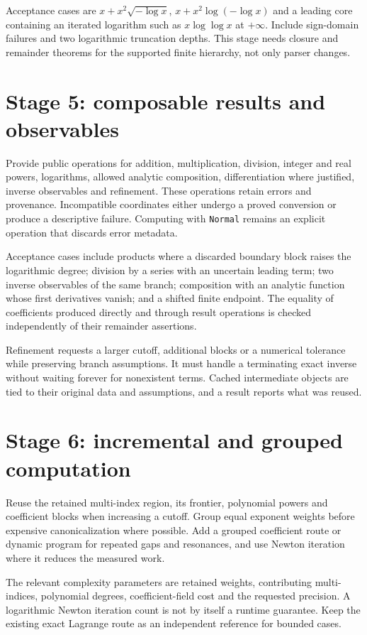 \documentclass[11pt,a4paper]{article}
\newcommand{\wl}[1]{\texttt{#1}}
\begin{document}
Acceptance cases are $x+x^2\sqrt{-\log x}$, $x+x^2\log(-\log x)$ and a leading core containing an iterated logarithm such as $x\log\log x$ at $+\infty$. Include sign-domain failures and two logarithmic truncation depths. This stage needs closure and remainder theorems for the supported finite hierarchy, not only parser changes.

\section{Stage 5: composable results and observables}

Provide public operations for addition, multiplication, division, integer and real powers, logarithms, allowed analytic composition, differentiation where justified, inverse observables and refinement. These operations retain errors and provenance. Incompatible coordinates either undergo a proved conversion or produce a descriptive failure. Computing with \wl{Normal} remains an explicit operation that discards error metadata.

Acceptance cases include products where a discarded boundary block raises the logarithmic degree; division by a series with an uncertain leading term; two inverse observables of the same branch; composition with an analytic function whose first derivatives vanish; and a shifted finite endpoint. The equality of coefficients produced directly and through result operations is checked independently of their remainder assertions.

Refinement requests a larger cutoff, additional blocks or a numerical tolerance while preserving branch assumptions. It must handle a terminating exact inverse without waiting forever for nonexistent terms. Cached intermediate objects are tied to their original data and assumptions, and a result reports what was reused.

\section{Stage 6: incremental and grouped computation}

Reuse the retained multi-index region, its frontier, polynomial powers and coefficient blocks when increasing a cutoff. Group equal exponent weights before expensive canonicalization where possible. Add a grouped coefficient route or dynamic program for repeated gaps and resonances, and use Newton iteration where it reduces the measured work.

The relevant complexity parameters are retained weights, contributing multi-indices, polynomial degrees, coefficient-field cost and the requested precision. A logarithmic Newton iteration count is not by itself a runtime guarantee. Keep the existing exact Lagrange route as an independent reference for bounded cases.
\end{document}
